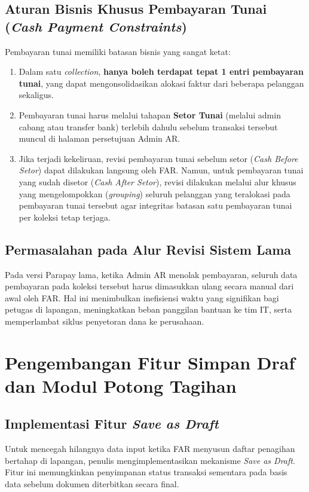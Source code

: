 \subsection{Aturan Bisnis Khusus Pembayaran Tunai (\textit{Cash Payment Constraints})}
Pembayaran tunai memiliki batasan bisnis yang sangat ketat:
\begin{enumerate}[label=\alph*)]
  \item Dalam satu \textit{collection}, \textbf{hanya boleh terdapat tepat 1 entri pembayaran tunai}, yang dapat mengonsolidasikan alokasi faktur dari beberapa pelanggan sekaligus.
  \item Pembayaran tunai harus melalui tahapan \textbf{Setor Tunai} (melalui admin cabang atau transfer bank) terlebih dahulu sebelum transaksi tersebut muncul di halaman persetujuan Admin AR.
  \item Jika terjadi kekeliruan, revisi pembayaran tunai sebelum setor (\textit{Cash Before Setor}) dapat dilakukan langsung oleh FAR. Namun, untuk pembayaran tunai yang sudah disetor (\textit{Cash After Setor}), revisi dilakukan melalui alur khusus yang mengelompokkan (\textit{grouping}) seluruh pelanggan yang teralokasi pada pembayaran tunai tersebut agar integritas batasan satu pembayaran tunai per koleksi tetap terjaga.
\end{enumerate}

\subsection{Permasalahan pada Alur Revisi Sistem Lama}
Pada versi Parapay lama, ketika Admin AR menolak pembayaran, seluruh data pembayaran pada koleksi tersebut harus dimasukkan ulang secara manual dari awal oleh FAR. Hal ini menimbulkan inefisiensi waktu yang signifikan bagi petugas di lapangan, meningkatkan beban panggilan bantuan ke tim IT, serta memperlambat siklus penyetoran dana ke perusahaan.

\section{Pengembangan Fitur Simpan Draf dan Modul Potong Tagihan}

\subsection{Implementasi Fitur \textit{Save as Draft}}
Untuk mencegah hilangnya data input ketika FAR menyusun daftar penagihan bertahap di lapangan, penulis mengimplementasikan mekanisme \textit{Save as Draft}. Fitur ini memungkinkan penyimpanan status transaksi sementara pada basis data sebelum dokumen diterbitkan secara final.


